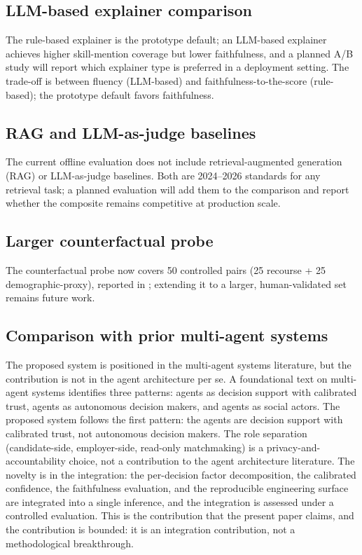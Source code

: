 \subsection{LLM-based explainer comparison}
The rule-based explainer is the prototype default; an LLM-based explainer achieves higher skill-mention coverage but lower faithfulness, and a planned A/B study will report which explainer type is preferred in a deployment setting. The trade-off is between fluency (LLM-based) and faithfulness-to-the-score (rule-based); the prototype default favors faithfulness.

\subsection{RAG and LLM-as-judge baselines}
The current offline evaluation does not include retrieval-augmented generation (RAG) \citep{lewis2020rag} or LLM-as-judge \citep{zheng2023judging} baselines. Both are 2024--2026 standards for any retrieval task; a planned evaluation will add them to the comparison and report whether the composite remains competitive at production scale.

\subsection{Larger counterfactual probe}
The counterfactual probe now covers 50 controlled pairs (25 recourse + 25 demographic-proxy), reported in ; extending it to a larger, human-validated set remains future work.

\subsection{Comparison with prior multi-agent systems}
The proposed system is positioned in the multi-agent systems literature, but the contribution is not in the agent architecture per se.
A foundational text on multi-agent systems \citep{wooldridge2009introduction} identifies three patterns: agents as decision support with calibrated trust, agents as autonomous decision makers, and agents as social actors.
The proposed system follows the first pattern: the agents are decision support with calibrated trust, not autonomous decision makers.
The role separation (candidate-side, employer-side, read-only matchmaking) is a privacy-and-accountability choice, not a contribution to the agent architecture literature.
The novelty is in the integration: the per-decision factor decomposition, the calibrated confidence, the faithfulness evaluation, and the reproducible engineering surface are integrated into a single inference, and the integration is assessed under a controlled evaluation.
This is the contribution that the present paper claims, and the contribution is bounded: it is an integration contribution, not a methodological breakthrough.
